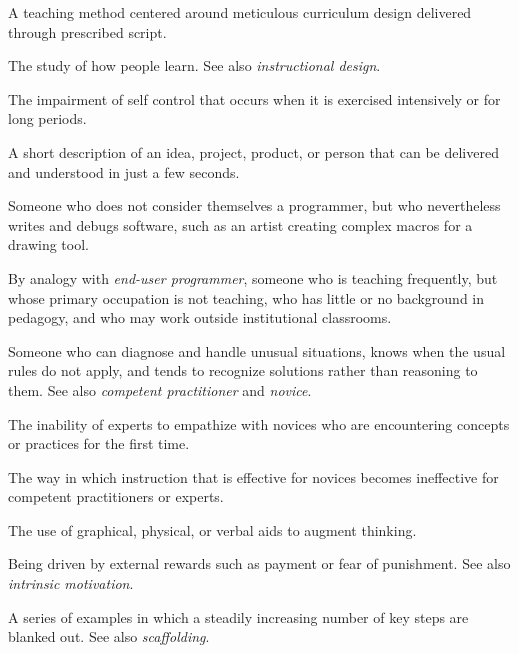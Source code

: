 \begin{description}
 A teaching method
centered around meticulous curriculum design delivered through
prescribed script.


 The study
of how people learn. See also \emph{instructional design}.

 The impairment of self
control that occurs when it is exercised intensively or for long
periods.

 A short description of an
idea, project, product, or person that can be delivered and understood
in just a few seconds.

 Someone who does
not consider themselves a programmer, but who nevertheless writes and
debugs software, such as an artist creating complex macros for a
drawing tool.

 By analogy with
\emph{end-user programmer}, someone who is teaching frequently, but
whose primary occupation is not teaching, who has little or no
background in pedagogy, and who may work outside institutional
classrooms.

 Someone who can diagnose and handle
unusual situations, knows when the usual rules do not apply, and tends
to recognize solutions rather than reasoning to them. See also
\emph{competent practitioner} and \emph{novice}.

 The inability of
experts to empathize with novices who are encountering concepts or
practices for the first time.

 The way in
which instruction that is effective for novices becomes ineffective
for competent practitioners or experts.

 The use of
graphical, physical, or verbal aids to augment thinking.

 Being driven
by external rewards such as payment or fear of punishment.  See also
\emph{intrinsic motivation}.


 A series of examples in
which a steadily increasing number of key steps are blanked out. See
also \emph{scaffolding}.


\end{description}

